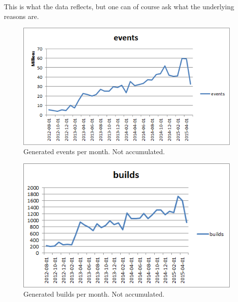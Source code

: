 This is what the data reflects, but one can of course ask what the underlying reasons are. 
%

\begin{figure}[h!]
\centering
\includegraphics[]{figure/events.png}
\caption{Generated events per month. Not accumulated.}
\label{fig:events}
\end{figure}

\begin{figure}[h!]
\centering
\includegraphics[]{figure/builds.png}
\caption{Generated builds per month. Not accumulated.}
\label{fig:builds}
\end{figure}

